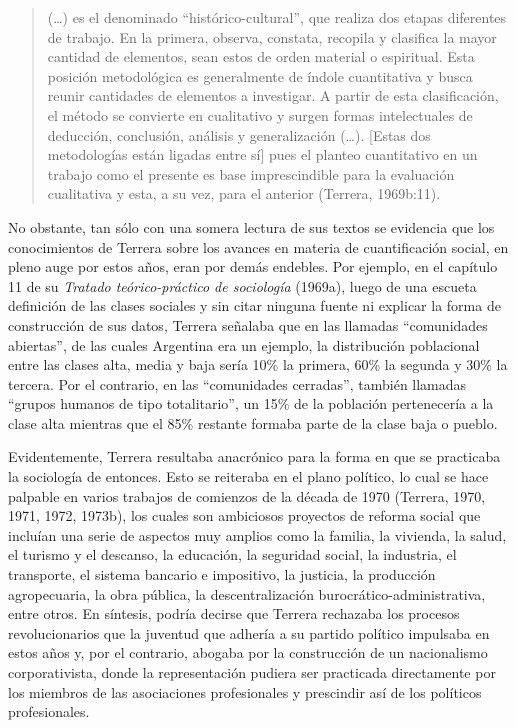 \begin{quote}
(\ldots) es el denominado ``histórico-cultural'', que realiza dos etapas diferentes de trabajo. En la primera, observa, constata, recopila y clasifica la mayor cantidad de elementos, sean estos de orden material o espiritual. Esta posición metodológica es generalmente de índole cuantitativa y busca reunir cantidades de elementos a investigar. A partir de esta clasificación, el método se convierte en cualitativo y surgen formas intelectuales de deducción, conclusión, análisis y generalización (\ldots). {[}Estas dos metodologías están ligadas entre sí{]} pues el planteo cuantitativo en un trabajo como el presente es base imprescindible para la evaluación cualitativa y esta, a su vez, para el anterior (Terrera, 1969b:11).
\end{quote}

No obstante, tan sólo con una somera lectura de sus textos se evidencia que los conocimientos de Terrera sobre los avances en materia de cuantificación social, en pleno auge por estos años, eran por demás endebles. Por ejemplo, en el capítulo 11 de su \emph{Tratado teórico-práctico de sociología} (1969a), luego de una escueta definición de las clases sociales y sin citar ninguna fuente ni explicar la forma de construcción de sus datos, Terrera señalaba que en las llamadas ``comunidades abiertas'', de las cuales Argentina era un ejemplo, la distribución poblacional entre las clases alta, media y baja sería 10\% la primera, 60\% la segunda y 30\% la tercera. Por el contrario, en las ``comunidades cerradas'', también llamadas ``grupos humanos de tipo totalitario'', un 15\% de la población pertenecería a la clase alta mientras que el 85\% restante formaba parte de la clase baja o pueblo.

Evidentemente, Terrera resultaba anacrónico para la forma en que se practicaba la sociología de entonces. Esto se reiteraba en el plano político, lo cual se hace palpable en varios trabajos de comienzos de la década de 1970 (Terrera, 1970, 1971, 1972, 1973b), los cuales son ambiciosos proyectos de reforma social que incluían una serie de aspectos muy amplios como la familia, la vivienda, la salud, el turismo y el descanso, la educación, la seguridad social, la industria, el transporte, el sistema bancario e impositivo, la justicia, la producción agropecuaria, la obra pública, la descentralización burocrático-administrativa, entre otros. En síntesis, podría decirse que Terrera rechazaba los procesos revolucionarios que la juventud que adhería a su partido político impulsaba en estos años y, por el contrario, abogaba por la construcción de un nacionalismo corporativista, donde la representación pudiera ser practicada directamente por los miembros de las asociaciones profesionales y prescindir así de los políticos profesionales.

